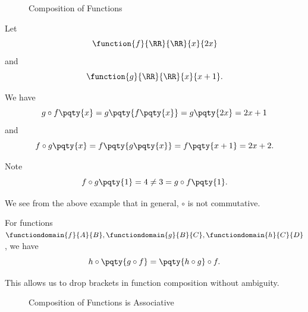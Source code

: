\begin{figure}[ht!]
    \centering
    \caption{Composition of Functions}
    \label{fig:composition-functions}
\end{figure}

\begin{example}
    Let
    \[
        \function{f}{\RR}{\RR}{x}{2x}
    \]
    and
    \[
        \function{g}{\RR}{\RR}{x}{x + 1}.
    \]

    We have
    \[
        g \circ f \pqty{x} = g \pqty{f \pqty{x}} = g \pqty{2x} = 2x + 1
    \]
    and
    \[
        f \circ g \pqty{x} = f \pqty{g \pqty{x}} = f \pqty{x + 1} = 2x + 2.
    \]

    Note
    \[
        f \circ g \pqty{1} = 4 \neq 3 = g \circ f \pqty{1}.
    \]  
\end{example}

We see from the above example that in general, \(\circ\) is not commutative.

\begin{proposition}
    For functions \(\functiondomain{f}{A}{B}, \functiondomain{g}{B}{C}, \functiondomain{h}{C}{D}\), we have
    \[
        h \circ \pqty{g \circ f} = \pqty{h \circ g} \circ f.
    \]

    This allows us to drop brackets in function composition without ambiguity.
\end{proposition}

\begin{figure}[ht!]
    \centering
    \caption{Composition of Functions is Associative}
    \label{fig:composition-functions-associative}
\end{figure}

